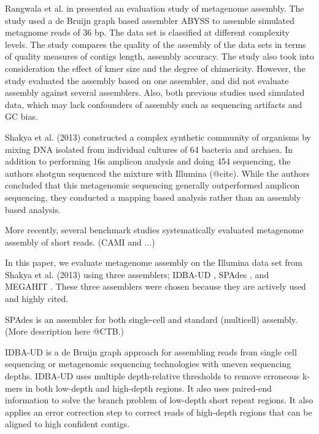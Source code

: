 \documentclass[10pt,a4paper,twocolumn]{article}
\begin{document}
Rangwala et al. in \cite{huzefa2011} presented an evaluation study of
metagenome assembly. The study used a de Bruijn graph based assembler
ABYSS \cite{abyss} to assemble simulated metagnome reads of 36 bp. The
data set is classified at different complexity levels.
The study compares the quality of the assembly of the data sets in
terms of quality measures of contigs length, assembly accuracy. The
study also took into consideration the effect of kmer size and the
degree of chimericity.  However, the study evaluated the assembly
based on one assembler, and did not evaluate assembly against several
assemblers.  Also, both previous studies used simulated data, which
may lack confounders of assembly such as sequencing artifacts and GC bias.

Shakya et al. (2013) constructed a complex synthetic community of
organisms by mixing DNA isolated from individual cultures of 64
bacteria and archaea.  In addition to performing 16s amplicon analysis
and doing 454 sequencing, the authors shotgun sequenced the mixture
with Illumina (@cite).  While the authors concluded that this metagenomic
sequencing generally outperformed amplicon sequencing, they conducted
a mapping based analysis rather than an assembly based analysis.


More recently, several benchmark studies systematically evaluated
metagenome assembly of short reads. (CAMI and ...)

In this paper, we evaluate metagenome assembly on the Illumina data set from
Shakya et al. (2013) using three assemblers; IDBA-UD \cite{idba},
SPAdes \cite {spades}, and MEGAHIT \cite{megahit}.  These three assemblers
were chosen because they are actively used and highly cited.

SPAdes \cite{spades} is an assembler for both single-cell and standard
(multicell) assembly. (More description here @CTB.)

IDBA-UD \cite{idba} is a de Bruijn graph
approach for assembling reads from single cell sequencing or
metagenomic sequencing technologies with uneven sequencing
depths. IDBA-UD uses multiple depth-relative thresholds to remove
erroneous k-mers in both low-depth and high-depth regions. It also
uses paired-end information to solve the branch problem of low-depth
short repeat regions. It also applies an error correction step to correct
reads of high-depth regions that can be aligned to high confident
contigs.
\end{document}
